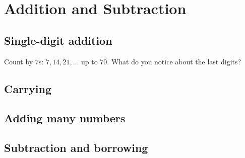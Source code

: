 \chapter{Addition and Subtraction}

\section{Single-digit addition}
\lesson
{}

\begin{exblock}[bookonly]
\begin{problem}
  Count by 7s: $7, 14, 21, \ldots$ up to $70$.
  What do you notice about the last digits?
\end{problem}
\end{exblock}

\section{Carrying}
\lesson
{}

\section{Adding many numbers}
\lesson
{}

\section{Subtraction and borrowing}
\lesson
{}
